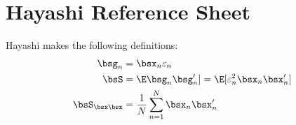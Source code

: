 \documentclass[12pt]{article}
\theoremstyle{plain}
\theoremstyle{definition}
\theoremstyle{remark}
\newcommand{\sumnN}{\sum^N_{n=1}}
\begin{document}
\clearpage
\section{Hayashi Reference Sheet}

Hayashi makes the following definitions:
\begin{align*}
  \bsg_n &= \bsx_n\varepsilon_n \\
  \bsS &= \E\bsg_n\bsg_n'] = \E[\varepsilon_n^2\bsx_n\bsx_n'] \\
  \bsS_{\bsx\bsx} &= \frac{1}{N}\sumnN \bsx_n\bsx_n'\\
\end{align*}

\end{document}
